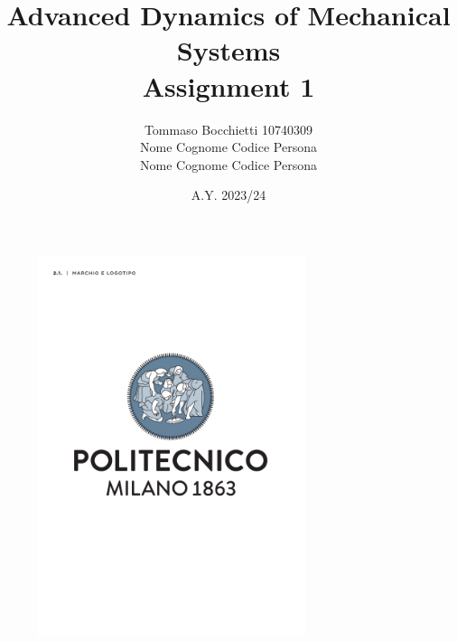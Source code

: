 \documentclass{assignment}
\begin{document}
\title{Advanced Dynamics of Mechanical Systems \\ Assignment 1}
\author{Tommaso Bocchietti 10740309 \\ Nome Cognome Codice Persona \\ Nome Cognome Codice Persona}
\date{A.Y. 2023/24}

\maketitle

\begin{figure}[H]
    \centering
    \includegraphics[width=0.7\textwidth]{./pdf/Polimi_logo_coverpage.pdf}
    \label{fig:Polimi_logo}
\end{figure}

\clearpage
\tableofcontents
\listoffigures
\listoftables

\clearpage






\clearpage




\vfill


\end{document}
